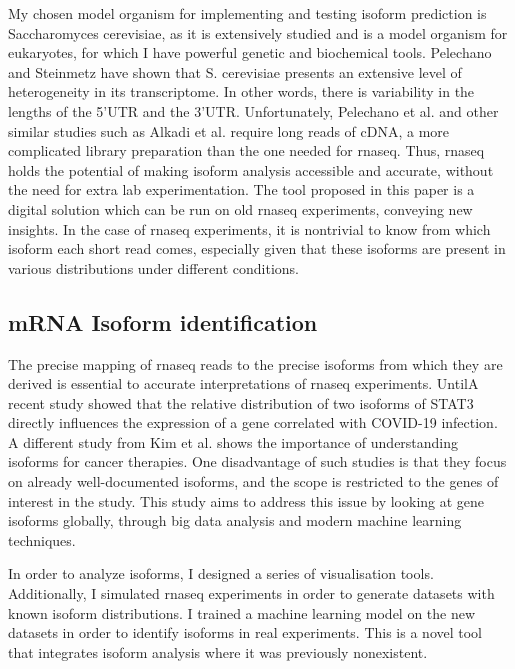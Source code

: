 \documentclass[12pt]{article}
\begin{document}
My chosen model organism for implementing and testing isoform prediction is Saccharomyces cerevisiae, as it is extensively studied and is a model organism for eukaryotes, for which I have powerful genetic and biochemical tools. Pelechano and Steinmetz \cite{Pelechano2013} have shown that S. cerevisiae presents an extensive level of heterogeneity in its transcriptome. In other words, there is variability in the lengths of the 5’UTR and the 3’UTR. Unfortunately, Pelechano et al. \cite{Pelechano2013} and other similar studies such as Alkadi et al. \cite{Alkadi2020} require long reads of cDNA, a more complicated library preparation than the one needed for \acrshort{rnaseq}. Thus, \acrshort{rnaseq} holds the potential of making isoform analysis accessible and accurate, without the need for extra lab experimentation. The tool proposed in this paper is a digital solution which can be run on old \acrshort{rnaseq} experiments, conveying new insights. In the case of \acrshort{rnaseq} experiments, it is nontrivial to know from which isoform each short read comes, especially given that these isoforms are present in various distributions under different conditions. 

\subsection{mRNA Isoform  identification}

The precise mapping of \acrshort{rnaseq} reads to the precise isoforms from which they are derived is essential to accurate interpretations of \acrshort{rnaseq}  experiments.
UntilA recent study \cite{Shamir2020} showed that the relative distribution of two isoforms of STAT3 directly influences the expression of a gene correlated with COVID-19 infection. A different study from Kim et al. \cite{Kim2009} shows the importance of understanding isoforms for cancer therapies. One disadvantage of such studies is that they focus on already well-documented isoforms, and the scope is restricted to the genes of interest in the study. This study aims to address this issue by looking at gene isoforms globally, through big data analysis and modern machine learning techniques. 

In order to analyze isoforms, I designed a series of visualisation tools. Additionally, I simulated \acrshort{rnaseq} experiments in order to generate datasets with known isoform distributions. I trained a machine learning model on the new datasets in order to identify isoforms in real experiments. This is a novel tool that integrates isoform analysis where it was previously nonexistent. 
\end{document}
